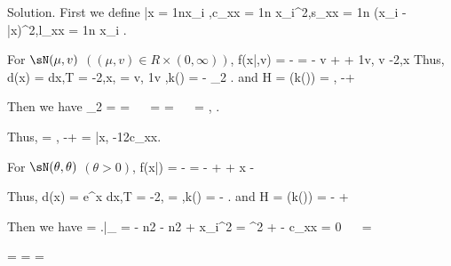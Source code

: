 Solution. First we define
\be
\bar{x} = \frac 1n\sum x_i ,\quad\quad c_{xx} = \frac 1n \sum x_i^2,\quad\quad s_{xx} = \frac 1n \sum(x_i - \bar{x})^2,\quad\quad l_{xx} = \frac 1n \sum\log x_i .
\ee

\ben
\item [(a)] For $\sN(\mu , v)$ $((\mu , v) \in R \times (0,\infty))$,
\be
f(x|\mu,v) = \exp \lob - \rob = \exp\lob - \lob \log v + \rob + \lob \frac 1v, \frac{\mu}v \rob\cdot \lob -2,x\rob\rob
\ee
Thus,
\be
d\mu(x) = dx,\quad\quad T = \lob -2,x\rob, \quad\quad \phi = \lob \frac{\mu}v, \frac 1v \rob,\quad \quad k(\phi) =  \lob {} - \log \phi_2 \rob  .
\ee
and
\be
H = \nabla (k(\phi)) = \lob {}, -\lob{}+ \rob\rob
\ee

Then we have
\be
\hat{\phi}_2 =  =  \ \ra \  =  =  \ \ra \ \hat{\phi} =  \lob {},  \rob.
\ee

Thus,
\be
{} = \lob {}, -\lob{}+ \rob\rob  = \lob \bar{x}, -\frac 12c_{xx}\rob.
\ee

\item [(b)] For $\sN(\theta, \theta)$ $(\theta > 0)$,
\be
f(x|\theta) = \exp \lob - \rob = \exp\lob - \lob \log \theta + \theta\rob + x - \rob
\ee

Thus,
\be
d\mu(x) = e^x dx,\quad\quad T = -2, \quad\quad \phi = ,\quad \quad k(\phi) =  \lob {} - \log \phi \rob  .
\ee
and
\be
H = \nabla (k(\phi)) = - \lob {} + \rob
\ee

Then we have
 = \left.\frac{\partial \ell}{\partial \theta}\right|_{\hat{\theta}} = - \frac n{2\theta} - \frac n2 +  \sum x_i^2 = \hat{\theta}^2 + \hat{\theta} - c_{xx} = 0 \ \ra \ \hat{\theta} = 
\ee

\be
\hat{\phi} =  =  = 
\ee

